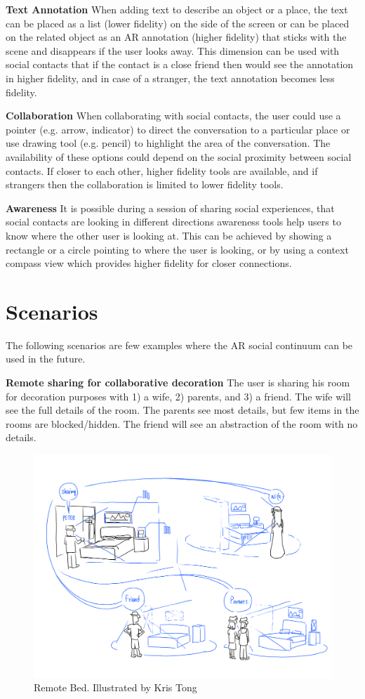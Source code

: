 \textbf{Text Annotation}
When adding text to describe an object or a place, the text can be placed as a list (lower fidelity) on the side of the screen or can be placed on the related object as an AR annotation (higher fidelity) that sticks with the scene and disappears if the user looks away. This dimension can be used with social contacts that if the contact is a close friend then would see the annotation in higher fidelity, and in case of a stranger, the text annotation becomes less fidelity. 

\textbf{Collaboration}
When collaborating with social contacts, the user could use a pointer (e.g. arrow, indicator) to direct the conversation to a particular place or use drawing tool (e.g. pencil) to highlight the area of the conversation. The availability of these options could depend on the social proximity between social contacts. If closer to each other, higher fidelity tools are available, and if strangers then the collaboration is limited to lower fidelity tools.

\textbf{Awareness}
It is possible during a session of sharing social experiences, that social contacts are looking in different directions awareness tools help users to know where the other user is looking at. This can be achieved by showing a rectangle or a circle pointing to where the user is looking, or by using a context compass view which provides higher fidelity for closer connections.

\section{Scenarios}

The following scenarios are few examples where the AR social continuum can be used in the future. 

\textbf{Remote sharing for collaborative decoration}
The user is sharing his room for decoration purposes with 1) a wife, 2) parents, and 3) a friend. The wife will see the full details of the room. The parents see most details, but few items in the rooms are blocked/hidden. The friend will see an abstraction of the room with no details. 

\begin{figure}[H]
    \centering
    \includegraphics[width=.8\linewidth]{images/illustrations/1_Remote_Bed.png}
    \caption{Remote Bed. Illustrated by Kris Tong}
    \label{fig:illustration:remote-bed}
\end{figure}

